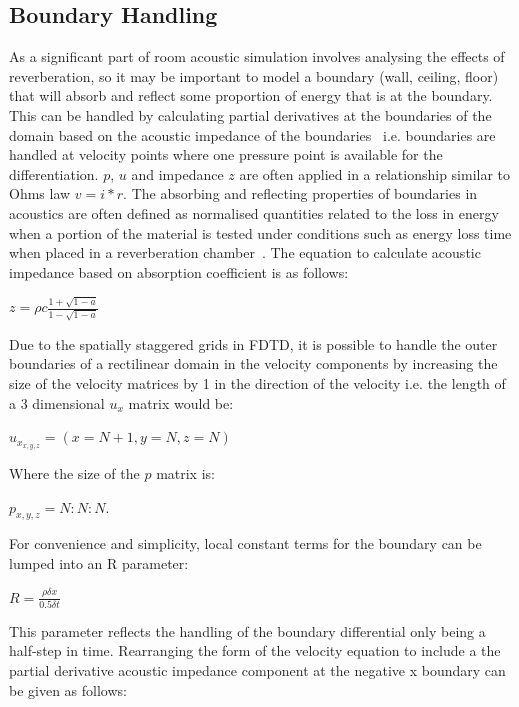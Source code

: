 \subsection{Boundary Handling}
As a significant part of room acoustic simulation involves analysing the effects of reverberation, so it may be important to model a boundary (wall, ceiling, floor) that will absorb and reflect some proportion of energy that is at the boundary. This can be handled by calculating partial derivatives at the boundaries of the domain based on the acoustic impedance of the boundaries~\cite{Olesen1997}\cite{Hill2012} i.e. boundaries are handled at velocity points where one pressure point is available for the differentiation. $p$, $u$ and impedance $z$ are often applied in a relationship similar to Ohms law $v = i * r $. The absorbing and reflecting properties of boundaries in acoustics are often defined as normalised quantities related to the loss in energy when a portion of the material is tested under conditions such as energy loss time when placed in a reverberation chamber~\cite{Beranek2006}. The equation to calculate acoustic impedance based on absorption coefficient is as follows:\\
\begin{center}
$z = \rho c \frac{1 + \sqrt{1 - a}}{1 - \sqrt{1 - a}} $\\
\end{center}
Due to the spatially staggered grids in FDTD, it is possible to handle the outer boundaries of a rectilinear domain in the velocity components by increasing the size of the velocity matrices by 1 in the direction of the velocity i.e. the length of a 3 dimensional $u_x$ matrix would be:\\
\begin{center}
$u_{x_{x,y,z}} = (x = N+1, y = N, z = N)$ 
\end{center} Where the size of the $p$ matrix is:\\
\begin{center}
 $p_{x,y,z} = N:N:N$. 
\end{center}
For convenience and simplicity, local constant terms for the boundary can  be lumped into an R parameter:\\
\begin{center}
$R = \frac{\rho \delta x}{0.5 \delta t}$\\
\end{center} 
This parameter reflects the handling of the boundary differential only being a half-step in time. Rearranging the form of the velocity equation to include a the partial derivative acoustic impedance component at the negative x boundary can be given as follows:\\
